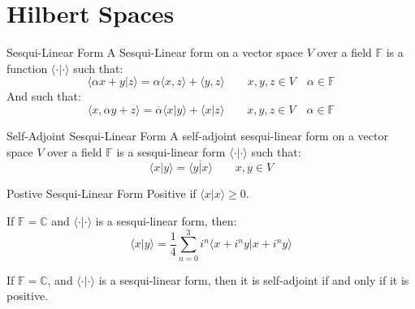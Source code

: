 \chapter{Hilbert Spaces}
    \begin{ldefinition}{Sesqui-Linear Form}
        A Sesqui-Linear form on a vector space $V$ over a
        field $\mathbb{F}$ is a function
        $\langle{\cdot|\cdot}\rangle$ such that:
        \begin{equation}
            \langle{\alpha{x}+y|z}\rangle
            =\alpha\langle{x,z}\rangle+\langle{y,z}\rangle
            \quad\quad
            x,y,z\in{V}
            \quad
            \alpha\in\mathbb{F}
        \end{equation}
        And such that:
        \begin{equation}
            \langle{x,\alpha{y}+z}\rangle
            =\overline{\alpha}\langle{x|y}\rangle
            +\langle{x|z}\rangle
           \quad\quad
            x,y,z\in{V}
            \quad
            \alpha\in\mathbb{F}
        \end{equation}
    \end{ldefinition}
    \begin{ldefinition}{Self-Adjoint Sesqui-Linear Form}
        A self-adjoint sesqui-linear form on a vector space
        $V$ over a field $\mathbb{F}$ is a sesqui-linear
        form $\langle{\cdot|\cdot}\rangle$ such that:
        \begin{equation}
            \langle{x|y}\rangle=\overline{\langle{y|x}\rangle}
            \quad\quad
            x,y\in{V}
        \end{equation}
    \end{ldefinition}
    \begin{ldefinition}{Postive Sesqui-Linear Form}
        Positive if $\langle{x|x}\rangle\geq{0}$.
    \end{ldefinition}
    \begin{theorem}
        If $\mathbb{F}=\mathbb{C}$ and
        $\langle{\cdot|\cdot}\rangle$ is a sesqui-linear
        form, then:
        \begin{equation}
            \langle{x|y}\rangle
            =\frac{1}{4}\sum_{n=0}^{3}
                i^{n}\langle{x+i^{n}y|x+i^{n}y}\rangle
        \end{equation}
    \end{theorem}
    \begin{theorem}
        If $\mathbb{F}=\mathbb{C}$, and
        $\langle{\cdot|\cdot}\rangle$ is a sesqui-linear
        form, then it is self-adjoint if and only if
        it is positive.
    \end{theorem}
